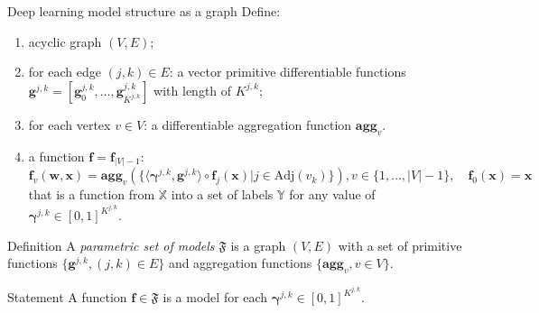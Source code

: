 \documentclass[usenames,dvipsnames,11pt,pdf,utf8,russian,aspectratio=43]{beamer}
\begin{document}
\begin{frame}{Deep learning model structure as a graph}
\footnotesize
Define:
\begin{enumerate}
 \item acyclic graph $(V,E)$;
\item for each edge $(j,k) \in E$: a vector primitive differentiable functions $\mathbf{g}^{j,k} = [\mathbf{g}^{j,k}_0, \dots, \mathbf{g}^{j,k}_{K^{j,k}}]$  with length of $K^{j,k}$;
\item for each vertex $v \in V$: a differentiable aggregation function  $\textbf{agg}_v$.
\item a function $\mathbf{f} = \mathbf{f}_{|V|-1}:$
\begin{equation}
\label{eq:modelfam}
    \mathbf{f}_{v}(\mathbf{w}, \mathbf{x}) = \textbf{agg}_{v}\left(\{ \langle \boldsymbol{\gamma}^{j,k}, \mathbf{g}^{j,k} \rangle \circ  \mathbf{f}_j(\mathbf{x})| j \in \text{Adj}(v_k)\}\right), v \in \{1,\dots,|V|-1\}, \quad \mathbf{f}_0(\mathbf{x}) = \mathbf{x}
\end{equation}
that is a function from  $\mathbb{X}$ into a set of labels $\mathbb{Y}$ for any value of  $\boldsymbol{\gamma}^{j,k} \in [0,1]^{K^{j,k}}$.
\end{enumerate}

\begin{block}{Definition}
A \textit{parametric set of models} $\mathfrak{F}$ is a graph $(V, E)$  with a set of primitive functions $\{\mathbf{g}^{j,k}, (j,k) \in E\}$ and aggregation functions  $\{ \textbf{agg}_v, {v \in V}\}$.
\end{block}
\begin{block}{Statement}
A function $\mathbf{f} \in \mathfrak{F}$ is a model for each  $\boldsymbol{\gamma}^{j,k} \in [0,1]^{K^{j,k}}$.
\end{block}
\end{frame}

      
\end{document}
